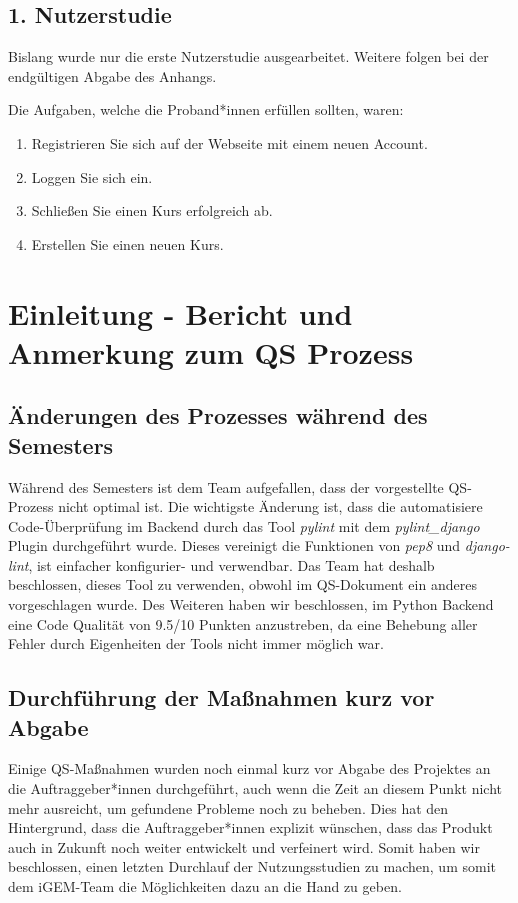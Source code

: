 \documentclass[accentcolor=tud0b,12pt,paper=a4]{tudreport}
\begin{document}
\section{1. Nutzerstudie}
Bislang wurde nur die erste Nutzerstudie ausgearbeitet. Weitere folgen bei der endgültigen Abgabe des Anhangs.

Die Aufgaben, welche die Proband*innen erfüllen sollten, waren:
\begin{enumerate}
	\item Registrieren Sie sich auf der Webseite mit einem neuen Account.
	\item Loggen Sie sich ein.
	\item Schließen Sie einen Kurs erfolgreich ab.
	\item Erstellen Sie einen neuen Kurs.
\end{enumerate}




\chapter{Einleitung - Bericht und Anmerkung zum QS Prozess}
\section{Änderungen des Prozesses während des Semesters}
Während des Semesters ist dem Team aufgefallen, dass der vorgestellte QS-Prozess nicht optimal ist. Die wichtigste Änderung ist, dass die automatisiere Code-Überprüfung im Backend durch das Tool \emph{pylint} mit dem \emph{pylint\_django} Plugin durchgeführt wurde. Dieses vereinigt die Funktionen von \emph{pep8} und \emph{django-lint}, ist einfacher konfigurier- und verwendbar. Das Team hat deshalb beschlossen, dieses Tool zu verwenden, obwohl im QS-Dokument ein anderes vorgeschlagen wurde. Des Weiteren haben wir beschlossen, im Python Backend eine Code Qualität von 9.5/10 Punkten anzustreben, da eine Behebung aller Fehler durch Eigenheiten der Tools nicht immer möglich war.

\section{Durchführung der Maßnahmen kurz vor Abgabe}
Einige QS-Maßnahmen wurden noch einmal kurz vor Abgabe des Projektes an die Auftraggeber*innen durchgeführt, auch wenn die Zeit an diesem Punkt nicht mehr ausreicht, um gefundene Probleme noch zu beheben. Dies hat den Hintergrund, dass die Auftraggeber*innen explizit wünschen, dass das Produkt auch in Zukunft noch weiter entwickelt und verfeinert wird. Somit haben wir beschlossen, einen letzten Durchlauf der Nutzungsstudien zu machen, um somit dem iGEM-Team die Möglichkeiten dazu an die Hand zu geben.
\end{document}
